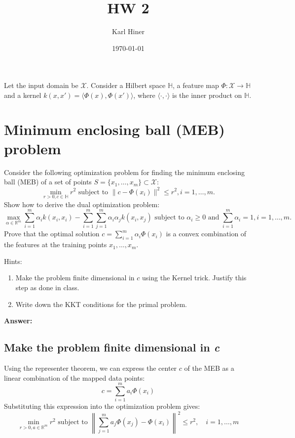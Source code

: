\documentclass{article}
\title{HW 2}
\author{Karl Hiner}
\date{\today}
\begin{document}
\maketitle	

Let the input domain be $\mathcal{X}$.
Consider a Hilbert space $\mathbb{H}$, a feature map $\Phi : \mathcal{X} \to \mathbb{H}$ and
a kernel $k(x, x') = \langle \Phi(x), \Phi(x')\rangle$, where $\langle \cdot, \cdot \rangle$ is the inner product on $\mathbb{H}$.

\section{Minimum enclosing ball (MEB) problem}

Consider the following optimization problem for finding the minimum enclosing ball
(MEB) of a set of points $S = \{x_1, \ldots, x_m\} \subset \mathcal{X}$:
$$\min_{r>0, c \in \mathbb{H}}{r^2} \text{ subject to } \|c - \Phi(x_i)\|^2 \leq r^2, i = 1, \dots, m.$$
Show how to derive the dual optimization problem:
$$\max_{\alpha \in \mathbb{R}^m}{\sum_{i=1}^m{\alpha_i k(x_i, x_i)} - \sum_{i=1}^m{\sum_{j=1}^m{\alpha_i\alpha_j k(x_i, x_j)}}} \text{ subject to } \alpha_i \geq 0 \text{ and } \sum_{i=1}^{m}{\alpha_i} = 1, i = 1, \dots, m.$$
Prove that the optimal solution $c = \sum_{i=1}^m{\alpha_i \Phi(x_i)}$ is a convex combination of the features at the training points $x_1, \dots, x_m$.

Hints:
\begin{enumerate}
\item Make the problem finite dimensional in $c$ using the Kernel trick.
Justify this step as done in class.
\item Write down the KKT conditions for the primal problem.
\end{enumerate}

\textbf{Answer:}

\subsection{Make the problem finite dimensional in \textit{c}}

Using the representer theorem, we can express the center \(c\) of the MEB as a linear combination of the mapped data points:
\[ c = \sum_{i=1}^{m} a_i \Phi(x_i) \]
Substituting this expression into the optimization problem gives:
\[ \min_{r>0, a \in \mathbb{R}^m}{r^2} \text{ subject to } \left\| \sum_{j=1}^{m} a_j \Phi(x_j) - \Phi(x_i) \right\|^2 \leq r^2, \quad i = 1, \dots, m \]
\end{document}
